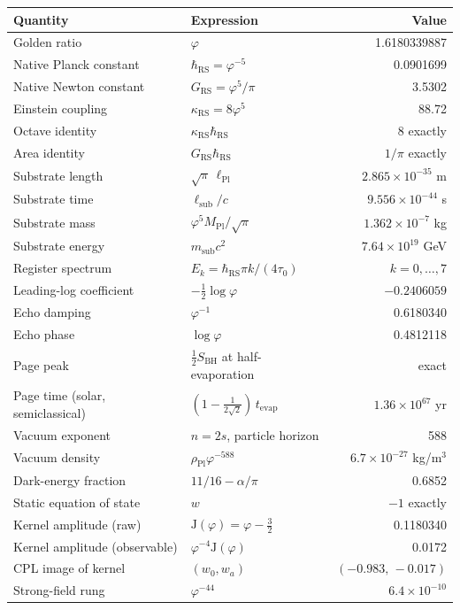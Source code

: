 \documentclass[11pt,letterpaper]{article}
\theoremstyle{definition}
\newcommand{\J}{\mathrm{J}}
\newcommand{\phiG}{\varphi}
\newcommand{\RS}{\mathrm{RS}}
\newcommand{\Pl}{\mathrm{Pl}}
\newcommand{\bsub}{\mathrm{sub}}
\newcommand{\BH}{\mathrm{BH}}
\newcommand{\half}{\tfrac{1}{2}}
\begin{document}
\begin{center}
\footnotesize
\renewcommand{\arraystretch}{1.2}
\begin{tabular}{p{5.2cm}lr}
\toprule
\textbf{Quantity} & \textbf{Expression} & \textbf{Value} \\
\midrule
Golden ratio & $\phiG$ & 1.6180339887 \\
Native Planck constant & $\hbar_\RS=\phiG^{-5}$ & 0.0901699 \\
Native Newton constant & $G_\RS=\phiG^5/\pi$ & 3.5302 \\
Einstein coupling & $\kappa_\RS=8\phiG^5$ & 88.72 \\
Octave identity & $\kappa_\RS\hbar_\RS$ & 8 exactly \\
Area identity & $G_\RS\hbar_\RS$ & $1/\pi$ exactly \\
Substrate length & $\sqrt{\pi}\,\ell_\Pl$ & $2.865\times10^{-35}$ m \\
Substrate time & $\ell_\bsub/c$ & $9.556\times10^{-44}$ s \\
Substrate mass & $\phiG^5M_\Pl/\sqrt{\pi}$ & $1.362\times10^{-7}$ kg \\
Substrate energy & $m_\bsub c^2$ & $7.64\times10^{19}$ GeV \\
Register spectrum & $E_k=\hbar_\RS\pi k/(4\tau_0)$ & $k=0,\ldots,7$ \\
Leading-log coefficient & $-\half\log\phiG$ & $-0.2406059$ \\
Echo damping & $\phiG^{-1}$ & 0.6180340 \\
Echo phase & $\log\phiG$ & 0.4812118 \\
Page peak & $\half S_\BH$ at half-evaporation & exact \\
Page time (solar, semiclassical) & $(1-\tfrac{1}{2\sqrt2})\,
t_{\mathrm{evap}}$ & $1.36\times10^{67}$ yr \\
Vacuum exponent & $n=2s$, particle horizon & 588 \\
Vacuum density & $\rho_\Pl\phiG^{-588}$ & $6.7\times10^{-27}$
kg/m$^3$ \\
Dark-energy fraction & $11/16-\alpha/\pi$ & 0.6852 \\
Static equation of state & $w$ & $-1$ exactly \\
Kernel amplitude (raw) & $\J(\phiG)=\phiG-\tfrac32$ & 0.1180340 \\
Kernel amplitude (observable) & $\phiG^{-4}\J(\phiG)$ & 0.0172 \\
CPL image of kernel & $(w_0,w_a)$ & $(-0.983,\,-0.017)$ \\
Strong-field rung & $\phiG^{-44}$ & $6.4\times10^{-10}$ \\
\bottomrule
\end{tabular}
\end{center}
\end{document}
